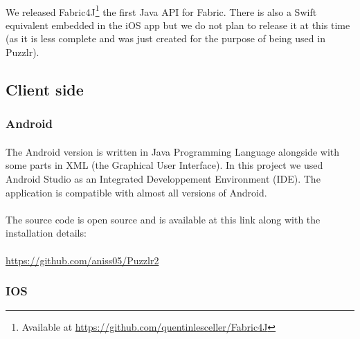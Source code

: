  			\paragraph{}
 			We released Fabric4J\footnote{Available at \url{https://github.com/quentinlesceller/Fabric4J}} the first Java API for Fabric. There is also a Swift equivalent embedded in the iOS app but we do not plan to release it at this time (as it is less complete and was just created for the purpose of being used in Puzzlr).
 	\subsection{Client side}
 		\subsubsection{Android}
  			\paragraph{}
			The Android version is written in Java Programming Language alongside with some parts in XML (the Graphical User Interface). In this project we used Android Studio as an Integrated Developpement Environment (IDE). The application is compatible with almost all versions of Android.
			\paragraph{}
			The source code is open source and is available at this link along with the installation details:
			\paragraph{}
			\color{blue}\underline{https://github.com/aniss05/Puzzlr2}\color{black} 
	  	
	\subsubsection{IOS}